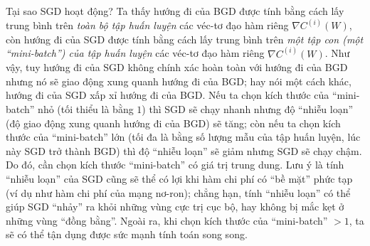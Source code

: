 Tại sao SGD hoạt động? Ta thấy hướng đi của BGD được tính bằng cách lấy trung bình trên \emph{toàn bộ tập huấn luyện} các véc-tơ đạo hàm riêng $\nabla C^{(i)}(W)$, còn hướng đi của SGD được tính bằng cách lấy trung bình trên \emph{một tập con (một ``mini-batch'') của tập huấn luyện} các véc-tơ đạo hàm riêng $\nabla C^{(i)}(W)$. Như vậy, tuy hướng đi của SGD không chính xác hoàn toàn với hướng đi của BGD nhưng nó sẽ giao động xung quanh hướng đi của BGD; hay nói một cách khác, hướng đi của SGD xấp xỉ hướng đi của BGD. Nếu ta chọn kích thước của ``mini-batch'' nhỏ (tối thiểu là bằng $1$) thì SGD sẽ chạy nhanh nhưng độ ``nhiễu loạn'' (độ giao động xung quanh hướng đi của BGD) sẽ tăng; còn nếu ta chọn kích thước của ``mini-batch'' lớn (tối đa là bằng số lượng mẫu của tập huấn luyện, lúc này SGD trở thành BGD) thì độ ``nhiễu loạn'' sẽ giảm nhưng SGD sẽ chạy chậm. Do đó, cần chọn kích thước ``mini-batch'' có giá trị trung dung. Lưu ý là tính ``nhiễu loạn'' của SGD cũng sẽ thể có lợi khi hàm chi phí có ``bề mặt'' phức tạp (ví dụ như hàm chi phí của mạng nơ-ron); chẳng hạn, tính ``nhiễu loạn'' có thể giúp SGD ``nhảy'' ra khỏi những vùng cực trị cục bộ, hay không bị mắc kẹt ở những vùng ``đồng bằng''. Ngoài ra, khi chọn kích thước của ``mini-batch'' $>1$, ta sẽ có thể tận dụng được sức mạnh tính toán song song.


